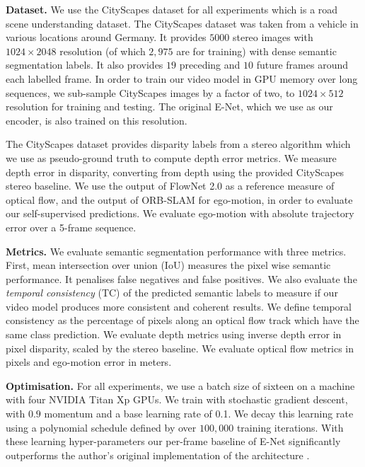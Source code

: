 \textbf{Dataset.} We use the CityScapes dataset for all experiments \cite{Cordts2016Cityscapes} which is a road scene understanding dataset. The CityScapes dataset was taken from a vehicle in various locations around Germany. It provides $5000$ stereo images with $1024 \times 2048$ resolution (of which $2,975$ are for training) with dense semantic segmentation labels. It also provides $19$ preceding and $10$ future frames around each labelled frame.
In order to train our video model in GPU memory over long sequences, we sub-sample CityScapes images by a factor of two, to $1024\times 512$ resolution for training and testing. The original E-Net, which we use as our encoder, is also trained on this resolution.

The CityScapes dataset provides disparity labels from a stereo algorithm \cite{Cordts2016Cityscapes} which we use as pseudo-ground truth to compute depth error metrics. We measure depth error in disparity, converting from depth using the provided CityScapes stereo baseline. We use the output of FlowNet 2.0 \cite{ilg2017flownet} as a reference measure of optical flow, and the output of ORB-SLAM \cite{mur2015orb} for ego-motion, in order to evaluate our self-supervised predictions. We evaluate ego-motion with absolute trajectory error over a 5-frame sequence.

\textbf{Metrics.} We evaluate semantic segmentation performance with three metrics. First, mean intersection over union (IoU) measures the pixel wise semantic performance. It penalises false negatives and false positives. We also evaluate the \textit{temporal consistency} (TC) of the predicted semantic labels to measure if our video model produces more consistent and coherent results. We define temporal consistency as the percentage of pixels along an optical flow track which have the same class prediction. We evaluate depth metrics using inverse depth error in pixel disparity, scaled by the stereo baseline. We evaluate optical flow metrics in pixels and ego-motion error in meters.

\textbf{Optimisation.} For all experiments, we use a batch size of sixteen on a machine with four NVIDIA Titan Xp GPUs. We train with stochastic gradient descent, with $0.9$ momentum and a base learning rate of 0.1. We decay this learning rate using a polynomial schedule defined by \cite{chen14semantic} over $100,000$ training iterations. With these learning hyper-parameters our per-frame baseline of E-Net significantly outperforms the author's original implementation of the architecture \cite{paszke2016enet}.


